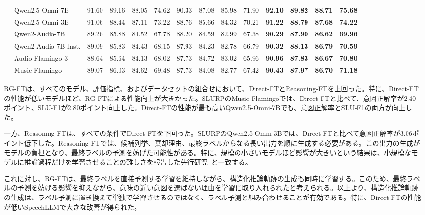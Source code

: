 \documentclass[11pt,a4paper]{ltjsarticle}
\begin{document}
\begin{table}[htbp]
{\begin{tabular}{llcccccccccccc}
\hline
{}
 & Qwen2.5-Omni-7B & 91.60 & 89.16 & 88.05 & 74.62 & 90.33 & 87.08 & 85.98 & 71.90 & \textbf{92.10} & \textbf{89.82} & \textbf{88.71} & \textbf{75.68} \\
 & Qwen2.5-Omni-3B & 91.06 & 88.44 & 87.11 & 73.22 & 88.76 & 85.66 & 84.32 & 70.21 & \textbf{91.22} & \textbf{88.79} & \textbf{87.68} & \textbf{74.22} \\
 & Qwen2-Audio-7B & 89.26 & 85.88 & 84.52 & 67.78 & 88.20 & 84.59 & 82.99 & 67.38 & \textbf{90.29} & \textbf{87.90} & \textbf{86.62} & \textbf{69.96} \\
 & Qwen2-Audio-7B-Inst. & 89.09 & 85.83 & 84.43 & 68.15 & 87.93 & 84.23 & 82.78 & 66.79 & \textbf{90.32} & \textbf{88.13} & \textbf{86.79} & \textbf{70.59} \\
 & Audio-Flamingo-3 & 88.64 & 85.64 & 84.13 & 68.02 & 87.73 & 84.72 & 83.02 & 65.96 & \textbf{90.96} & \textbf{87.83} & \textbf{86.67} & \textbf{70.80} \\
 & Music-Flamingo & 89.07 & 86.03 & 84.62 & 69.48 & 87.73 & 84.08 & 82.77 & 67.42 & \textbf{90.43} & \textbf{87.97} & \textbf{86.70} & \textbf{71.18} \\
\hline
\end{tabular}%
}
\end{table}

RG-FTは、すべてのモデル、評価指標、およびデータセットの組合せにおいて、Direct-FTとReasoning-FTを上回った。特に、Direct-FTの性能が低いモデルほど、RG-FTによる性能向上が大きかった。SLURPのMusic-Flamingoでは、Direct-FTと比べて、意図正解率が2.40ポイント、SLU-F1が2.80ポイント向上した。Direct-FTの性能が最も高いQwen2.5-Omni-7Bでも、意図正解率とSLU-F1の両方が向上した。

一方、Reasoning-FTは、すべての条件でDirect-FTを下回った。SLURPのQwen2.5-Omni-3Bでは、Direct-FTと比べて意図正解率が3.06ポイント低下した。Reasoning-FTでは、候補列挙、棄却理由、最終ラベルからなる長い出力を順に生成する必要がある。この出力の生成がモデルの負担となり、最終ラベルの予測を妨げた可能性がある。特に、規模の小さいモデルほど影響が大きいという結果は、小規模なモデルに推論過程だけを学習させることの難しさを報告した先行研究~\cite{li-etal-2025-small-models,chen-etal-2025-unveiling-key,chen-etal-2025-skip}と一致する。

これに対し、RG-FTは、最終ラベルを直接予測する学習を維持しながら、構造化推論軌跡の生成も同時に学習する。このため、最終ラベルの予測を妨げる影響を抑えながら、意味の近い意図を選ばない理由を学習に取り入れられたと考えられる。以上より、構造化推論軌跡の生成は、ラベル予測に置き換えて単独で学習させるのではなく、ラベル予測と組み合わせることが有効である。特に、Direct-FTの性能が低いSpeechLLMで大きな改善が得られた。
\end{document}
